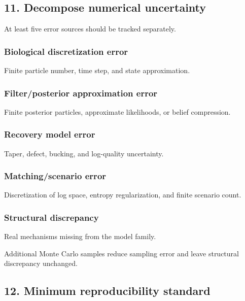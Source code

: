 \subsection{11. Decompose numerical uncertainty}\label{decompose-numerical-uncertainty}

At least five error sources should be tracked separately.

\subsubsection{Biological discretization error}\label{biological-discretization-error}

Finite particle number, time step, and state approximation.

\subsubsection{Filter/posterior approximation error}\label{filterposterior-approximation-error}

Finite posterior particles, approximate likelihoods, or belief compression.

\subsubsection{Recovery model error}\label{recovery-model-error}

Taper, defect, bucking, and log-quality uncertainty.

\subsubsection{Matching/scenario error}\label{matchingscenario-error}

Discretization of log space, entropy regularization, and finite scenario count.

\subsubsection{Structural discrepancy}\label{structural-discrepancy}

Real mechanisms missing from the model family.

Additional Monte Carlo samples reduce sampling error and leave structural
discrepancy unchanged.

\subsection{12. Minimum reproducibility standard}\label{minimum-reproducibility-standard}

